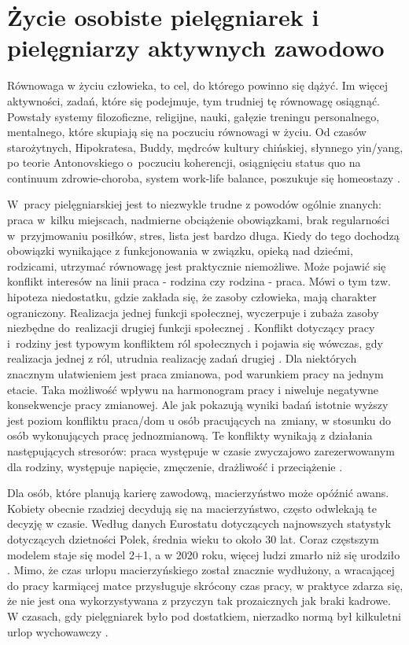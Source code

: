 \documentclass[a4paper,12pt,twoside,openright]{mwrep}
\begin{document}
\section{Życie osobiste pielęgniarek i pielęgniarzy aktywnych zawodowo}
\label{sectionZycieOsobiste}
Równowaga w życiu człowieka, to cel, do którego powinno się dążyć. Im więcej aktywności, zadań, które się podejmuje, tym trudniej tę równowagę osiągnąć. Powstały systemy filozoficzne, religijne, nauki, gałęzie treningu personalnego, mentalnego, które skupiają się na poczuciu równowagi w życiu. Od czasów starożytnych, Hipokratesa, Buddy, mędrców kultury chińskiej, słynnego yin/yang, po teorie Antonovskiego o~poczuciu koherencji, osiągnięciu status quo na continuum zdrowie-choroba, system work-life balance, poszukuje się homeostazy \cite{salutogeneza}.

W~pracy pielęgniarskiej jest to niezwykle trudne z powodów ogólnie znanych: praca w~kilku miejscach, nadmierne obciążenie obowiązkami, brak regularności w~przyjmowaniu posiłków, stres, lista jest bardzo długa. Kiedy do tego dochodzą obowiązki wynikające z funkcjonowania w związku, opieką nad dziećmi, rodzicami, utrzymać równowagę jest praktycznie niemożliwe. Może pojawić się konflikt interesów na linii praca - rodzina czy rodzina - praca. Mówi o tym tzw. hipoteza niedostatku,  gdzie zakłada się, że zasoby człowieka, mają charakter ograniczony. Realizacja jednej funkcji społecznej, wyczerpuje i zubaża zasoby niezbędne do~realizacji drugiej funkcji społecznej \cite{hipoteza}. Konflikt dotyczący pracy i~rodziny jest typowym konfliktem ról społecznych i pojawia się wówczas, gdy realizacja jednej z ról, utrudnia realizację zadań drugiej \cite{relacja}. Dla niektórych znacznym ułatwieniem jest praca zmianowa, pod warunkiem pracy na jednym etacie. Taka możliwość wpływu na harmonogram pracy i niweluje negatywne konsekwencje pracy zmianowej. Ale jak pokazują wyniki badań istotnie wyższy jest poziom konfliktu praca/dom u osób pracujących na~zmiany, w stosunku do osób wykonujących pracę jednozmianową. Te konflikty wynikają z działania następujących stresorów: praca występuje w czasie zwyczajowo zarezerwowanym dla rodziny, występuje napięcie, zmęczenie, drażliwość i przeciążenie \cite{konflikt}.
  
Dla osób, które planują karierę zawodową, macierzyństwo może opóźnić awans. Kobiety obecnie rzadziej decydują się na macierzyństwo, często odwlekają te decyzję w czasie. Według danych Eurostatu dotyczących najnowszych statystyk dotyczących dzietności Polek, średnia wieku to około 30 lat. Coraz częstszym modelem staje się model 2+1, a w 2020 roku, więcej ludzi zmarło niż się urodziło \cite{dzieci}. Mimo, że czas urlopu macierzyńskiego został znacznie wydłużony, a wracającej do pracy karmiącej matce przysługuje skrócony czas pracy, w praktyce zdarza się, że nie jest ona wykorzystywana z przyczyn tak prozaicznych jak braki kadrowe. W czasach, gdy pielęgniarek było pod dostatkiem, nierzadko normą był kilkuletni urlop wychowawczy \cite{urlop}.
\end{document}
